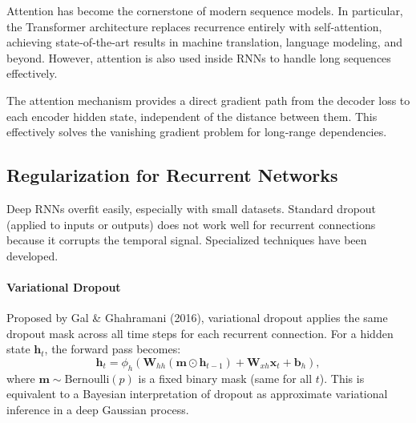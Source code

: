 \documentclass{tufte-handout}
\begin{document}
Attention has become the cornerstone of modern sequence models. In particular, the Transformer architecture replaces recurrence entirely with self‑attention, achieving state‑of‑the‑art results in machine translation, language modeling, and beyond. However, attention is also used inside RNNs to handle long sequences effectively.

\begin{thm}
    The attention mechanism provides a direct gradient path from the decoder loss to each encoder hidden state, independent of the distance between them. This effectively solves the vanishing gradient problem for long‑range dependencies.
\end{thm}

\subsection{Regularization for Recurrent Networks}

Deep RNNs overfit easily, especially with small datasets. Standard dropout (applied to inputs or outputs) does not work well for recurrent connections because it corrupts the temporal signal. Specialized techniques have been developed.

\paragraph{Variational Dropout}
Proposed by Gal \& Ghahramani (2016), variational dropout applies the same dropout mask across all time steps for each recurrent connection. For a hidden state $\mathbf{h}_t$, the forward pass becomes:
\[
\mathbf{h}_t = \phi_h(\mathbf{W}_{hh}(\mathbf{m} \odot \mathbf{h}_{t-1}) + \mathbf{W}_{xh}\mathbf{x}_t + \mathbf{b}_h),
\]
where $\mathbf{m} \sim \text{Bernoulli}(p)$ is a fixed binary mask (same for all $t$). This is equivalent to a Bayesian interpretation of dropout as approximate variational inference in a deep Gaussian process.

\begin{marginfigure}
\centering
{}
\caption{Variational dropout: same mask $\mathbf{m}$ applied at every time step.}
\end{marginfigure}
\end{document}
